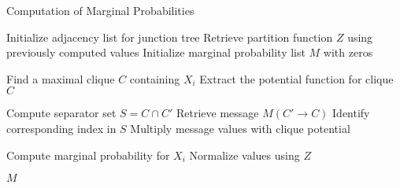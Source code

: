 \documentclass{article}
\begin{document}
\begin{algorithm}
    \caption{Computation of Marginal Probabilities}
    \begin{algorithmic}[1]
    

    \State Initialize adjacency list for junction tree
    \State Retrieve partition function $Z$ using previously computed values
    \State Initialize marginal probability list $M$ with zeros

        \State Find a maximal clique $C$ containing $X_i$
        \State Extract the potential function for clique $C$

            \State Compute separator set $S = C \cap C'$
            \State Retrieve message $M(C' \to C)$
                \State Identify corresponding index in $S$
                \State Multiply message values with clique potential
            \EndFor
        \EndFor

        \State Compute marginal probability for $X_i$
        \State Normalize values using $Z$
    \EndFor

    \State \Return $M$
    \end{algorithmic}
\end{algorithm}
\end{document}
